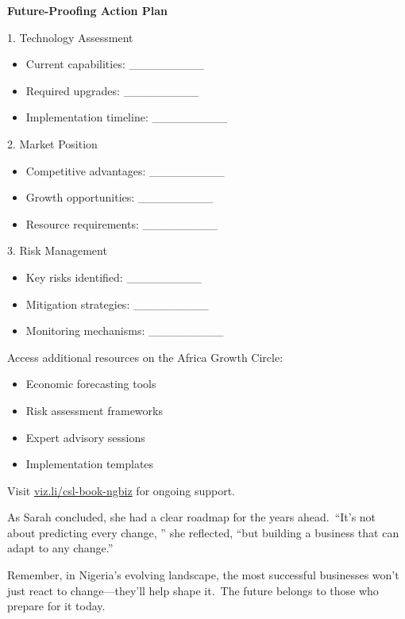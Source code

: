 \begin{workshopbox}
    \textbf{Future-Proofing Action Plan}

    1. Technology Assessment
    \begin{itemize}
        \item Current capabilities: \_\_\_\_\_\_\_\_\_
        \item Required upgrades: \_\_\_\_\_\_\_\_\_
        \item Implementation timeline: \_\_\_\_\_\_\_\_\_
    \end{itemize}

    2. Market Position
    \begin{itemize}
        \item Competitive advantages: \_\_\_\_\_\_\_\_\_
        \item Growth opportunities: \_\_\_\_\_\_\_\_\_
        \item Resource requirements: \_\_\_\_\_\_\_\_\_
    \end{itemize}

    3. Risk Management
    \begin{itemize}
        \item Key risks identified: \_\_\_\_\_\_\_\_\_
        \item Mitigation strategies: \_\_\_\_\_\_\_\_\_
        \item Monitoring mechanisms: \_\_\_\_\_\_\_\_\_
    \end{itemize}
\end{workshopbox}

\begin{communitybox}
    Access additional resources on the Africa Growth Circle:
    \begin{itemize}
        \item Economic forecasting tools
        \item Risk assessment frameworks
        \item Expert advisory sessions
        \item Implementation templates
    \end{itemize}
    Visit \href{https://viz.li/csl-book-ngbiz}{viz.li/csl-book-ngbiz} for ongoing support.
\end{communitybox}

\begin{importantbox}
    As Sarah concluded, she had a clear roadmap for the years ahead.\ ``It's not about predicting every change, '' she reflected, ``but building a business that can adapt to any change.''

    Remember, in Nigeria's evolving landscape, the most successful businesses won't just react to change—they'll help shape it.\ The future belongs to those who prepare for it today.
\end{importantbox}
